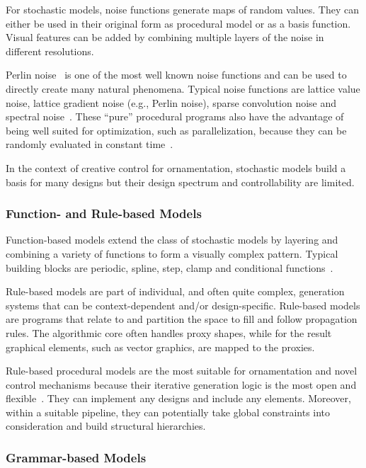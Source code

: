 For stochastic models, noise functions generate maps of random values. They can either be used in their original form as procedural model or as a basis function. Visual features can be added by combining multiple layers of the noise in different resolutions.

Perlin noise~\cite{perlin_1985_ais} is one of the most well known noise functions and can be used to directly create many natural phenomena. Typical noise functions are lattice value noise, lattice gradient noise (e.g., Perlin noise), sparse convolution noise and spectral noise~\cite{ebert_2003_tmp,lagae_2010_sap}. These ``pure'' procedural programs also have the advantage of being well suited for optimization, such as parallelization, because they can be randomly evaluated in constant time~\cite{lagae_2010_sap}.

In the context of creative control for ornamentation, stochastic models build a basis for many designs but their design spectrum and controllability are limited.


\subsubsection{Function- and Rule-based Models}
\label{subsubsec:models_function}

Function-based models extend the class of stochastic models by layering and combining a variety of functions to form a visually complex pattern. Typical building blocks are periodic, spline, step, clamp and conditional functions~\cite{ebert_2003_tmp}. 

Rule-based models are part of individual, and often quite complex, generation systems that can be context-dependent and/or design-specific. Rule-based models are programs that relate to and partition the space to fill and follow propagation rules. The algorithmic core often handles proxy shapes, while for the result graphical elements, such as vector graphics, are mapped to the proxies.

Rule-based procedural models are the most suitable for ornamentation and novel control mechanisms because their iterative generation logic is the most open and flexible~\cite{wong_1998_cgf, mech_2012_tdf}. They can implement any designs and include any elements. Moreover, within a suitable pipeline, they can potentially take global constraints into consideration and build structural hierarchies.


\subsubsection{Grammar-based Models}
\label{subsubsec:models_grammar}

